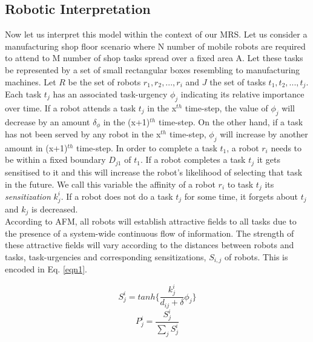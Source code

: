 \subsection{Robotic Interpretation}
Now let us interpret this model within the context of our MRS. Let us consider a manufacturing shop floor scenario where N number of mobile robots are required to attend to M number of shop tasks spread over a fixed area A.
Let these tasks be represented by a set of small rectangular boxes resembling to manufacturing machines.
Let $R$ be the set of robots ${r_1, r_2,...,r_i}$ and $J$ the set of tasks ${t_1, t_2,...,t_j}$.
Each task $t_j$ has an associated task-urgency $\phi_j$ indicating its relative importance over time.
If a robot attends a task $t_j$ in the x$^{th}$ time-step, the value of $\phi_j$ will decrease by an amount $\delta_\phi$ in the (x+1)$^{th}$ time-step.
On the other hand, if a task has not been served by any robot in the x$^{th}$ time-step, $\phi_j$ will increase by another amount in (x+1)$^{th}$ time-step.
In order to complete a task $t_1$, a robot $r_i$ needs to be within a fixed boundary $D_{j1}$ of $t_1$.
If a robot completes a task $t_j$ it gets sensitised to it and this will increase the robot's likelihood of selecting that task in the future.
We call this variable the affinity of a robot $r_i$ to task $t_j$ its {\em sensitization} $k_{j}^{i}$.
If a robot does not do a task $t_j$ for some time, it forgets about $t_j$ and $k_j$ is decreased.\\
According to AFM, all robots will establish attractive fields to all tasks due to the presence of a system-wide continuous flow of information.
The strength of these attractive fields will vary according to the distances between robots and tasks, task-urgencies and corresponding sensitizations, $S_{i,j}$ of robots. This is encoded in Eq. \ref{eqn1}.
\begin{multicols}{2}
\begin{equation}
S_{j}^{i} = tanh\{\frac{k_{j}^{i}}{d_{ij}+\delta } \phi _{j}\}
\label{eqn1}
\end{equation}
\vspace*{0.25cm}
\begin{equation}
P_{j}^{i} = \frac{S_{j}^{i}}{\sum_{j}^{}S_{j}^{i}}
\label{eqn2}
\end{equation}
\end{multicols}
